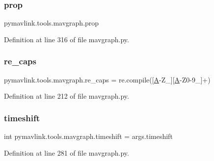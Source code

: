 \subsubsection{\texorpdfstring{prop}{prop}}
{\footnotesize\ttfamily pymavlink.\+tools.\+mavgraph.\+prop}



Definition at line 316 of file mavgraph.\+py.

\mbox{\label{namespacepymavlink_1_1tools_1_1mavgraph_a3635bc37df2af78d82ed236ef6f8b265}} 
\subsubsection{\texorpdfstring{re\_caps}{re\_caps}}
{\footnotesize\ttfamily pymavlink.\+tools.\+mavgraph.\+re\+\_\+caps = re.\+compile(\textquotesingle{}\mbox{[}\mbox{\hyperlink{mavlink__sha256_8h_a955f504eccf76b4eb2489c0adab03121}{A}}-\/Z\+\_\+\mbox{]}\mbox{[}\mbox{\hyperlink{mavlink__sha256_8h_a955f504eccf76b4eb2489c0adab03121}{A}}-\/Z0-\/9\+\_\+\mbox{]}+\textquotesingle{})}



Definition at line 212 of file mavgraph.\+py.

\mbox{\label{namespacepymavlink_1_1tools_1_1mavgraph_a3e1ff395cb61a46b7bfcd65d9562d82b}} 
\subsubsection{\texorpdfstring{timeshift}{timeshift}}
{\footnotesize\ttfamily int pymavlink.\+tools.\+mavgraph.\+timeshift = args.\+timeshift}



Definition at line 281 of file mavgraph.\+py.

\mbox{\label{namespacepymavlink_1_1tools_1_1mavgraph_a6b0ee2dd540205466967e46d4a31a412}} 
